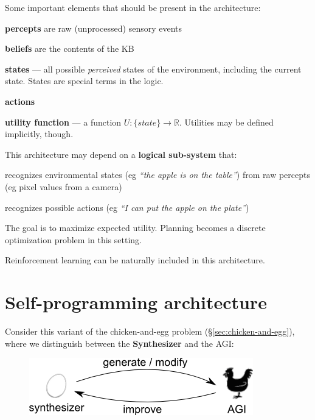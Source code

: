 Some important elements that should be present in the architecture:
\begin{compactenum}[1.]
\item  \textbf{percepts} are raw (unprocessed) sensory events
\item  \textbf{beliefs} are the contents of the KB
\item  \textbf{states} --- all possible \textit{perceived} states of the environment, including the current state.  States are special terms in the logic.
\item  \textbf{actions}
\item  \textbf{utility function} --- a function $U: \{state\} \rightarrow \mathbb{R}$.  Utilities may be defined implicitly, though.
\\
\end{compactenum}

This architecture may depend on a \textbf{logical sub-system} that:
\begin{compactenum}[1.]
\item  recognizes environmental states (eg \textit{``the apple is on the table''}) from raw percepts (eg pixel values from a camera)
\item  recognizes possible actions (eg \textit{``I can put the apple on the plate''})
\\
\end{compactenum}

The goal is to maximize expected utility.  Planning becomes a discrete optimization problem in this setting.

Reinforcement learning  can be naturally included in this architecture.

\section{Self-programming architecture}
\label{sec:self-programming-architecture}

Consider this variant of the chicken-and-egg problem (\S\ref{sec:chicken-and-egg}), where we distinguish between the \textbf{Synthesizer} and the AGI:
\begin{figure}[H]
\centering
\includegraphics{self-programming-architecture.png}
\vspace{-0.5cm}
\end{figure}

